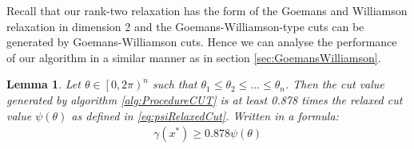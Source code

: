 \documentclass[12pt,a4paper]{article}
\theoremstyle{mythm}
\newtheorem{lem}[thm]{Lemma}
\begin{document}
Recall that our rank-two relaxation has the form of the Goemans and Williamson relaxation in dimension 2 and the Goemans-Williamson-type cuts can be generated by Goemans-Williamson
cuts.
Hence we can analyse the performance of our algorithm in a similar manner as in section \ref{sec:GoemansWilliamson}.
\begin{lem}
Let $ \theta \in \left[ 0 , 2 \pi  \right) ^{ n }  $ such that $ \theta_1 \leq \theta_2 \leq \dots \leq \theta_n    $. Then the cut value generated by algorithm \ref{alg:ProcedureCUT} is at least 0.878 times the relaxed cut value $ \psi (\theta) $ as defined in
\ref{eq:psiRelaxedCut}. 
Written in a formula:
\begin{align}
\label{eq:perfguarantee} 
\gamma (x^*) \geq 0.878 \psi (\theta) 
\end{align} 
\end{lem} 
\end{document}
